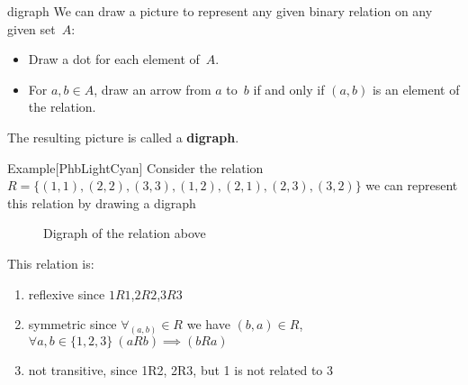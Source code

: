 \documentclass[../MATH-2000-Notes.tex]{subfiles}
\begin{document}
\begin{Definition}
    {digraph}
    We can draw a picture to represent any given binary relation on any given set~$A$:
    \begin{itemize}
        \item Draw a dot for each element of~$A$.
        \item For $a,b \in A$, draw an arrow from $a$ to~$b$ if and only if $(a,b)$ is an element of the relation.
    \end{itemize}
    The resulting picture is called a \textbf{digraph}.
\end{Definition}
\begin{commentbox}{Example}[{PhbLightCyan}]
    Consider the relation \(R = \{(1,1),(2,2),(3,3),(1,2),(2,1),(2,3),(3,2)\}\) we can represent this relation by drawing a digraph
\end{commentbox}
\begin{figure}[htbp]
    \centering


    \caption{Digraph of the relation above}
    \label{fig:digraph}
\end{figure}

This relation is:
\begin{enumerate}
    \item reflexive since \(1R1\),\(2R2\),\(3R3\)
    \item symmetric since \(\forall_{(a,b)}\in R\) we have \((b,a)\in R\), \(\forall a,b \in \{1,2,3\}\ (aRb)\implies (bRa)\)
    \item not transitive, since 1R2, 2R3, but 1 is not related to 3
\end{enumerate}
\end{document}
